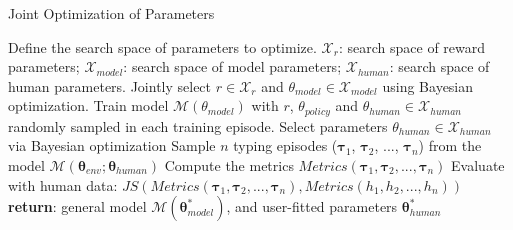 \begin{algorithm}
    \caption{Joint Optimization of Parameters}\label{alg:opt}
    \begin{algorithmic}[1]
    \Require Define the search space of parameters to optimize.
    \newline $\mathcal{X}_{r}$: search space of reward parameters; 
    \newline$\mathcal{X}_{model}$: search space of model parameters; 
    \newline$\mathcal{X}_{human}$: search space of human parameters.
    \State Jointly select $r \in \mathcal{X}_{r}$ and $\theta_{model} \in \mathcal{X}_{model}$ using Bayesian optimization.
    \State Train model $\mathcal{M}(\theta_{model})$ with $r$, $\theta_{policy}$ and $\theta_{human} \in \mathcal{X}_{human}$ randomly sampled in each training episode.
    \State Select parameters $\theta_{human} \in \mathcal{X}_{human}$ via Bayesian optimization
    \State Sample $n$ typing episodes ($\boldsymbol{\tau}_1$, $\boldsymbol{\tau}_2$, ..., $\boldsymbol{\tau}_{n}$) from the model $\mathcal{M}(\boldsymbol{\theta}_{env};\boldsymbol{\theta}_{human})$
    \State Compute the metrics $Metrics(\boldsymbol{\tau}_1, \boldsymbol{\tau}_2, ..., \boldsymbol{\tau}_{n})$ 
    \State Evaluate with human data: $JS(Metrics(\boldsymbol{\tau}_1, \boldsymbol{\tau}_2, ..., \boldsymbol{\tau}_{n}), Metrics({h}_1, {h}_2, ..., {h}_{n}))$ 
    \EndWhile
    \EndWhile
    \State \textbf{return}: general model $\mathcal{M}(\boldsymbol{\theta}^*_{model})$, and user-fitted parameters $\boldsymbol{\theta}^*_{human}$
    \end{algorithmic}
\end{algorithm}